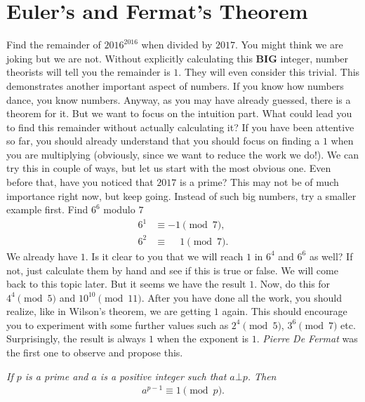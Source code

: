 \documentclass{subfile}
\begin{document}
	\section{Euler's and Fermat's Theorem}
	Find the remainder of $2016^{2016}$ when divided by $2017$. You might think we are joking but we are not. Without explicitly calculating this \textbf{BIG} integer, number theorists will tell you the remainder is $1$. They will even consider this trivial. This demonstrates another important aspect of numbers. If you know how numbers dance, you know numbers. Anyway, as you may have already guessed, there is a theorem for it. But we want to focus on the intuition part. What could lead you to find this remainder without actually calculating it? If you have been attentive so far, you should already understand that you should focus on finding a $1$ when you are multiplying (obviously, since we want to reduce the work we do!). We can try this in couple of ways, but let us start with the most obvious one. Even before that, have you noticed that $2017$ is a prime? This may not be of much importance right now, but keep going. Instead of such big numbers, try a smaller example first. Find $6^6$ modulo $7$
		\begin{align*}
			6^1 & \equiv -1\pmod7,\\
			6^2 & \equiv \phantom{-}1\pmod7.
		\end{align*}
	We already have $1$. Is it clear to you that we will reach $1$ in $6^4$ and $6^6$ as well? If not, just calculate them by hand and see if this is true or false. We will come back to this topic later. But it seems we have the result $1$. Now, do this for $4^4\pmod5$ and $10^{10}\pmod{11}$. After you have done all the work, you should realize, like in Wilson's theorem, we are getting $1$ again. This should encourage you to experiment with some further values such as $2^4\pmod5$, $3^6\pmod7$ etc. Surprisingly, the result is always $1$ when the exponent is $1$. \textit{Pierre De Fermat} was the first one to observe and propose this.
		\begin{theorem}\slshape
			If $p$ is a prime and $a$ is a positive integer such that $a \bot p$. Then
			\begin{align*}
				a^{p-1} \equiv 1 \pmod p.
			\end{align*}
		\end{theorem}
\end{document}
